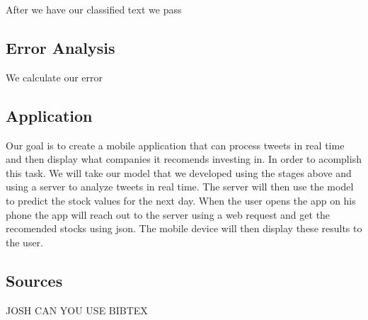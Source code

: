 \documentclass{acm_proc_article-sp}
\begin{document}
After we have our classified text we pass 

\subsection{Error Analysis}

We calculate our error

\subsection{Application}

Our goal is to create a mobile application that can process tweets in real time
and then display what companies it recomends investing in. In order to
acomplish this task. We will take our model that we developed using the stages
above and using a server to analyze tweets in real time. The server will then
use the model to predict the stock values for the next day. When the user opens
the app on his phone the app will reach out to the server using a web request
and get the recomended stocks using json. The mobile device will then display
these results to the user.

\subsection{Sources}

JOSH CAN YOU USE BIBTEX

 
\end{document}
